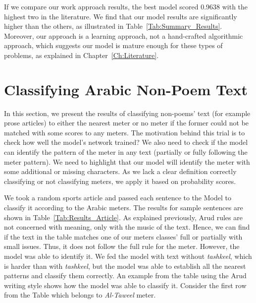 If we compare our work approach results, the best model scored 0.9638 with the highest two in the literature. We find that our model results are significantly higher than the others, as illustrated in Table~\ref{Tab:Summary_Results}. Moreover, our approach is a learning approach, not a hand-crafted algorithmic approach, which suggests our model is mature enough for these types of problems, as explained in Chapter~\ref{Ch:Literature}.


\section{Classifying Arabic Non-Poem Text}

In this section, we present the results of classifying non-poems’ text (for example prose articles) to either the nearest meter or no meter if the former could not be matched with some scores to any meters. The motivation behind this trial is to check how well the model’s network trained? We also need to check if the model can identify the pattern of the meter in any text (partially or fully following the meter pattern). We need to highlight that our model will identify the meter with some additional or missing characters. As we lack a clear definition correctly classifying or not classifying meters, we apply it based on probability scores.

We took a random sports article and passed each sentence to the Model to classify it according to the Arabic meters. The results for sample sentences are shown in Table~\ref{Tab:Results_Article}. As explained previously, Arud rules are not concerned with meaning, only with the music of the text. Hence, we can find if the text in the table matches one of our meters classes’ full or partially with small issues. Thus, it does not follow the full rule for the meter. However, the model was able to identify it. We fed the model with text without \textit{tashkeel}, which is harder than with \textit{tashkeel}, but the model was able to establish all the nearest patterns and classify them correctly. An example from the table using the Arud writing style shows how the model was able to classify it. Consider the first row from the Table which belongs to \textit{Al-Taweel} meter.


